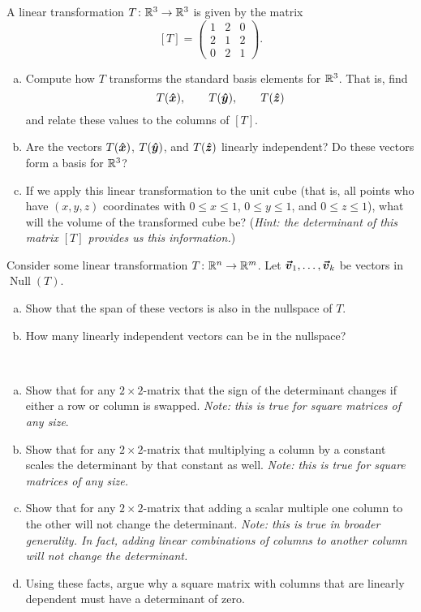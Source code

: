 \documentclass[12pt]{article} %
\begin{document}
\begin{problem}
A linear transformation $T\colon \mathbb{R}^3 \to \mathbb{R}^3$ is given by the matrix
\[
[T]= \begin{pmatrix}
1& 2& 0\\
2& 1& 2\\
0& 2& 1
\end{pmatrix}.
\]
\begin{enumerate}[(a)]
    \item Compute how $T$ transforms the standard basis elements for $\mathbb{R}^3$. That is, find
    \[
    T(\boldsymbol{\hat{x}}), \qquad
    T(\boldsymbol{\hat{y}}), \qquad
    T(\boldsymbol{\hat{z}})
    \]
    and relate these values to the columns of $[T]$.
    \item Are the vectors $T(\boldsymbol{\hat{x}})$, $T(\boldsymbol{\hat{y}})$, and $T(\boldsymbol{\hat{z}})$ linearly independent? Do these vectors form a basis for $\mathbb{R}^3$?
    \item If we apply this linear transformation to the unit cube (that is, all points who have $(x,y,z)$ coordinates with $0\leq x \leq 1$, $0\leq y \leq 1$, and $0\leq z \leq 1$), what will the volume of the transformed cube be? (\emph{Hint: the determinant of this matrix $[T]$ provides us this information.})
\end{enumerate}
\end{problem}

\begin{problem}
Consider some linear transformation $T\colon \mathbb{R}^n \to \mathbb{R}^m$.  Let $\boldsymbol{\vec{v}}_1, \dots, \boldsymbol{\vec{v}}_k$ be vectors in $\operatorname{Null}(T)$.
\begin{enumerate}[(a)]
    \item Show that the span of these vectors is also in the nullspace of $T$.
    \item How many linearly independent vectors can be in the nullspace?
\end{enumerate}
\end{problem}

\begin{problem}~
\begin{enumerate}[(a)]
    \item Show that for any $2\times 2$-matrix that the sign of the determinant changes if either a row or column is swapped. \emph{Note: this is true for square matrices of any size}.
    \item Show that for any $2\times 2$-matrix that multiplying a column by a constant scales the determinant by that constant as well. \emph{Note: this is true for square matrices of any size.}
    \item Show that for any $2\times 2$-matrix that adding a scalar multiple one column to the other will not change the determinant. \emph{Note: this is true in broader generality. In fact, adding linear combinations of columns to another column will not change the determinant.}
    \item Using these facts, argue why a square matrix with columns that are linearly dependent must have a determinant of zero.
\end{enumerate}
\end{problem}
\end{document}
